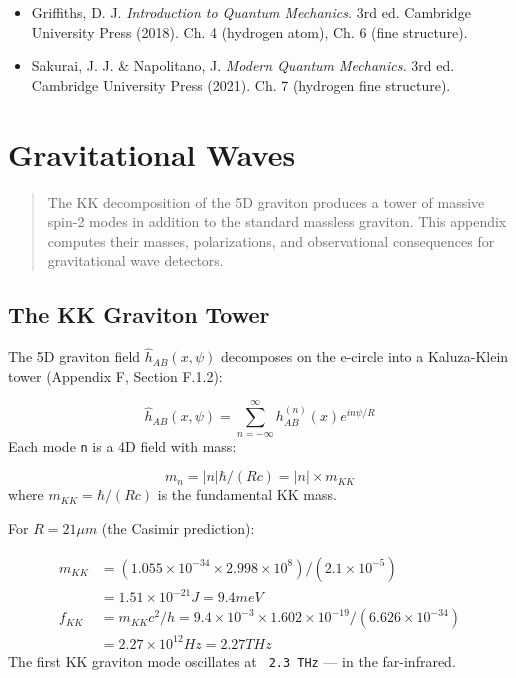 \documentclass[aps,prd,preprint,superscriptaddress,longbibliography,floatfix]{revtex4-2}
\theoremstyle{remark}
\begin{document}
\begin{itemize}
  \item Griffiths, D. J. \textit{Introduction to Quantum Mechanics.} 3rd ed. Cambridge University Press (2018). Ch. 4 (hydrogen atom), Ch. 6 (fine structure).
  \item Sakurai, J. J. \& Napolitano, J. \textit{Modern Quantum Mechanics.} 3rd ed. Cambridge University Press (2021). Ch. 7 (hydrogen fine structure).
\end{itemize}


\section{Gravitational Waves}


\begin{quote}
The KK decomposition of the 5D graviton produces a tower of massive spin-2
modes in addition to the standard massless graviton. This appendix computes
their masses, polarizations, and observational consequences for gravitational
wave detectors.
\end{quote}



\subsection{The KK Graviton Tower}

The 5D graviton field $\hat{h}_{AB}(x, \psi)$ decomposes on the e-circle into a Kaluza-Klein tower (Appendix F, Section F.1.2):


\begin{equation}
    \hat{h}_{AB}(x, \psi) = \sum_{n=-\infty}^{\infty} h_{AB}^{(n)}(x) e^{in\psi/R}
\end{equation}
Each mode \texttt{n} is a 4D field with mass:


\begin{equation}
    m_n = |n| \hbar / (Rc) = |n| \times m_{KK}
\end{equation}
where $m_{KK} = \hbar/(Rc)$ is the fundamental KK mass.

For $R = 21 \mu m$ (the Casimir prediction):


\begin{align}
    m_{KK} &= (1.055 \times 10^{-34} \times 2.998 \times 10^{8}) / (2.1 \times 10^{-5}) \\
    & = 1.51 \times 10^{-21} J = 9.4 meV \\
    f_{KK} &= m_{KK} c^{2} / h = 9.4 \times 10^{-3} \times 1.602 \times 10^{-19} / (6.626 \times 10^{-34}) \\
    & = 2.27 \times 10^{12} Hz = 2.27 THz
\end{align}
The first KK graviton mode oscillates at \texttt{~2.3 THz} --- in the far-infrared.
\end{document}
